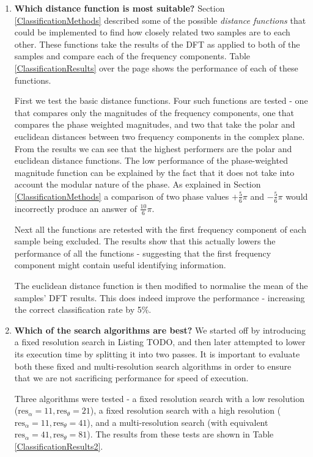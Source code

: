 \begin{enumerate}
	\item \textbf{Which distance function is most suitable?}
		Section \ref{ClassificationMethods} described some of the possible \emph{distance functions} that could be implemented to find how closely related two samples are to each other.
		These functions take the results of the DFT as applied to both of the samples and compare each of the frequency components.
		Table \ref{ClassificationResults} over the page shows the performance of each of these functions.
		
		First we test the basic distance functions.
		Four such functions are tested - one that compares only the magnitudes of the frequency components, one that compares the phase weighted magnitudes, and two that take the polar and euclidean distances between two frequency components in the complex plane.
		From the results we can see that the highest performers are the polar and euclidean distance functions.
		The low performance of the phase-weighted magnitude function can be explained by the fact that it does not take into account the modular nature of the phase.
		As explained in Section \ref{ClassificationMethods} a comparison of two phase values $+\frac{5}{6}\pi$ and $-\frac{5}{6}\pi$ would incorrectly produce an answer of $\frac{10}{6}\pi$.
		
		Next all the functions are retested with the first frequency component of each sample being excluded.
		The results show that this actually lowers the performance of all the functions - suggesting that the first frequency component might contain useful identifying information.
		
		The euclidean distance function is then modified to normalise the mean of the samples' DFT results.
		This does indeed improve the performance - increasing the correct classification rate by 5\%.
	
	\item \textbf{Which of the search algorithms are best?}
		We started off by introducing a fixed resolution search in Listing TODO, and then later attempted to lower its execution time by splitting it into two passes.
		It is important to evaluate both these fixed and multi-resolution search algorithms in order to ensure that we are not sacrificing performance for speed of execution.
		
		Three algorithms were tested - a fixed resolution search with a low resolution ($\text{res}_\alpha = 11, \text{res}_\theta = 21$),
		a fixed resolution search with a high resolution ($\text{res}_\alpha = 11, \text{res}_\theta = 41$),
		and a multi-resolution search (with equivalent $\text{res}_\alpha = 41, \text{res}_\theta = 81$).
		The results from these tests are shown in Table \ref{ClassificationResults2}.
		

\end{enumerate}
